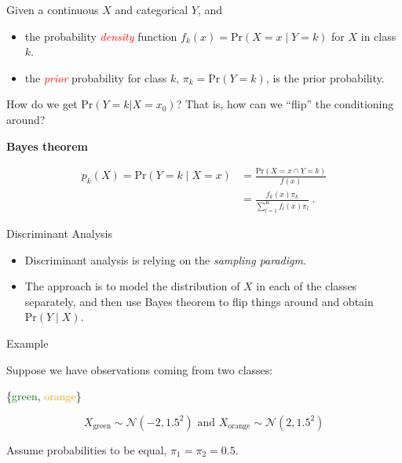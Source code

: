 \documentclass[
  10pt,
  ignorenonframetext,
]{beamer}
\providecommand{\tightlist}{%
  \setlength{\itemsep}{0pt}\setlength{\parskip}{0pt}}
\begin{document}
\begin{frame}
Given a continuous \(X\) and categorical \(Y\), and

\begin{itemize}
\tightlist
\item
  the probability \emph{\textcolor{red}{density}} function
  \(f_k(x) = \text{Pr}(X=x \mid Y=k)\) for \(X\) in class \(k\).
\item
  the \emph{\textcolor{red}{prior}} probability for class \(k\),
  \(\pi_k = \text{Pr}(Y=k)\), is the prior probability.
\end{itemize}

How do we get \(\text{Pr}(Y=k | X=x_0)\)? That is, how can we ``flip''
the conditioning around? \vspace{4mm}

\begin{block}{\textbf{Bayes theorem}}
\protect\hypertarget{bayes-theorem}{}
\vspace{-3mm}

\begin{align}
p_k(X) = \text{Pr}(Y=k \mid X= x) &= 
\frac{\text{Pr}(X=x \cap Y=k)}{f(x)} \nonumber\\
&= \frac{ f_k(x) \pi_k}{\sum_{l=1}^K  f_l(x) \pi_l}  \ . \label{eq:Bayes}
\end{align}
\end{block}
\end{frame}

\begin{frame}{Discriminant Analysis}
\protect\hypertarget{discriminant-analysis}{}
\vspace{2mm}

\begin{itemize}
\item
  Discriminant analysis is relying on the \emph{sampling paradigm}.
\item
  The approach is to model the distribution of \(X\) in each of the
  classes separately, and then use Bayes theorem to flip things around
  and obtain \(\text{Pr}(Y \mid X)\).
\end{itemize}

\vspace{2mm}

\begin{block}{Example}
\protect\hypertarget{example}{}
\vspace{2mm}

Suppose we have observations coming from two classes:

\{\textcolor{green}{green}, \textcolor{orange}{orange}\}

\[X_{\text{green}}\sim \mathcal{N}(-2, 1.5^2) \text{ and }
X_{\text{orange}}\sim \mathcal{N}(2, 1.5^2) \]

\vspace{2mm}

Assume probabilities to be equal, \(\pi_1 = \pi_2 = 0.5\).
\end{block}
\end{frame}
\end{document}
